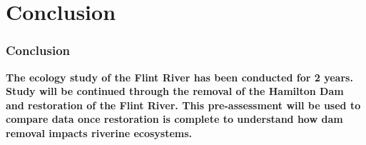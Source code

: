 \documentclass[10pt]{beamer}
\newcommand{\iast}{\item[$\circledast$]}
\begin{document}

\section{Conclusion}



\begin{frame}
    \frametitle{Conclusion} %
    \textbf{ \Large \hspace{5mm}
        The ecology study of the Flint River has been conducted for 2 years. 
        Study will be continued through the removal of the Hamilton Dam and restoration of the Flint River. 
        This pre-assessment will be used to compare data once restoration is 
        complete to understand how dam removal impacts riverine ecosystems.
        }
\end{frame}

\end{document}

